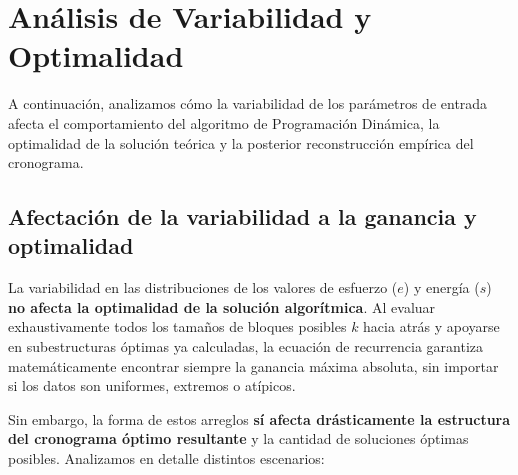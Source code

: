 \section{Análisis de Variabilidad y Optimalidad}

A continuación, analizamos cómo la variabilidad de los parámetros de entrada afecta el comportamiento del algoritmo de Programación Dinámica, la optimalidad de la solución teórica y la posterior reconstrucción empírica del cronograma.

\subsection{Afectación de la variabilidad a la ganancia y optimalidad}

La variabilidad en las distribuciones de los valores de esfuerzo ($e$) y energía ($s$) \textbf{no afecta la optimalidad de la solución algorítmica}. Al evaluar exhaustivamente todos los tamaños de bloques posibles $k$ hacia atrás y apoyarse en subestructuras óptimas ya calculadas, la ecuación de recurrencia garantiza matemáticamente encontrar siempre la ganancia máxima absoluta, sin importar si los datos son uniformes, extremos o atípicos.

Sin embargo, la forma de estos arreglos \textbf{sí afecta drásticamente la estructura del cronograma óptimo resultante} y la cantidad de soluciones óptimas posibles. Analizamos en detalle distintos escenarios:

